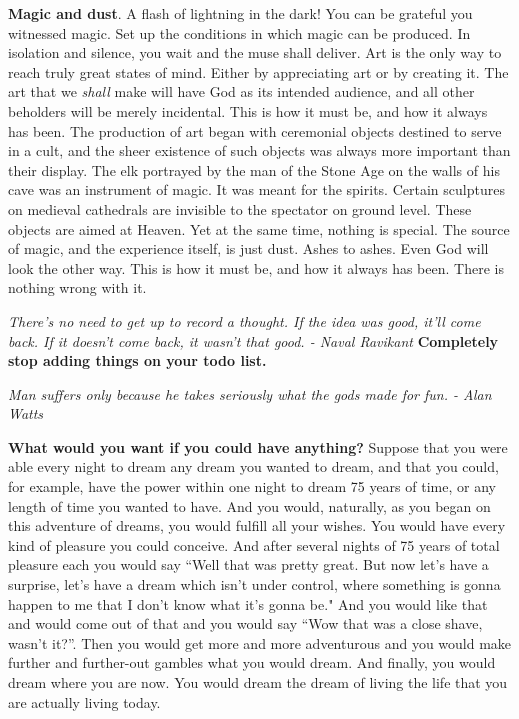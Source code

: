 \documentclass[a4paper,hidelinks]{article}
\begin{document}
\textbf{Magic and dust}.
A flash of lightning in the dark!
You can be grateful you witnessed magic.
Set up the conditions in which magic can be produced.
In isolation and silence, you wait and the muse shall deliver.
Art is the only way to reach truly great states of mind.
Either by appreciating art or by creating it.
The art that we \textit{shall} make will have God as its intended audience, and all other beholders will be merely incidental.
This is how it must be, and how it always has been.
The production of art began with ceremonial objects destined to serve in a cult, and the sheer existence of such objects was always more important than their display.
The elk portrayed by the man of the Stone Age on the walls of his cave was an instrument of magic.
It was meant for the spirits.
Certain sculptures on medieval cathedrals are invisible to the spectator on ground level.
These objects are aimed at Heaven.
Yet at the same time, nothing is special.
The source of magic, and the experience itself, is just dust.
Ashes to ashes.
Even God will look the other way.
This is how it must be, and how it always has been.
There is nothing wrong with it.

\newpage

\begin{center}
\textit{
There's no need to get up to record a thought. If the idea was good, it’ll come back. If it doesn’t come back, it wasn’t that good. - Naval Ravikant
}
\newline
\newline
\textbf{
Completely stop adding things on your todo list.
}
\end{center}

\newpage

\begin{center}
\textit{
Man suffers only because he takes seriously what the gods made for fun. - Alan Watts
}
\end{center}

\textbf{What would you want if you could have anything?}
Suppose that you were able every night to dream any dream you wanted to dream, and that you could, for example, have the power within one night to dream 75 years of time, or any length of time you wanted to have.
And you would, naturally, as you began on this adventure of dreams, you would fulfill all your wishes.
You would have every kind of pleasure you could conceive.
And after several nights of 75 years of total pleasure each you would say “Well that was pretty great. But now let’s have a surprise, let’s have a dream which isn’t under control, where something is gonna happen to me that I don’t know what it's gonna be."
And you would like that and would come out of that and you would say “Wow that was a close shave, wasn’t it?”.
Then you would get more and more adventurous and you would make further and further-out gambles what you would dream.
And finally, you would dream where you are now.
You would dream the dream of living the life that you are actually living today.
\end{document}
